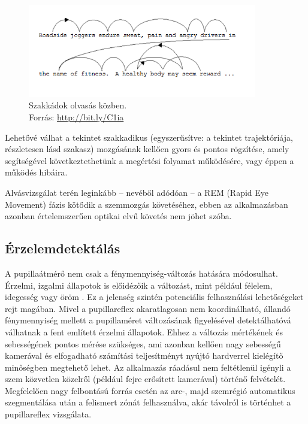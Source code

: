 \begin{figure}[!ht]
\centering
\includegraphics[width=100mm, keepaspectratio]{figures/read_saccade.png}
\caption{Szakkádok olvasás közben.\\Forrás: \url{http://bit.ly/C1ia}}
\label{fig:read_saccade}
\end{figure}

Lehetővé válhat a tekintet szakkadikus (egyszerűsítve: a tekintet trajektóriája, részletesen lásd  szakasz) mozgásának kellően gyors és pontos rögzítése, amely segítségével következtethetünk a megértési folyamat működésére, vagy éppen a működés hibáira. 

\bigskip

Alvásvizsgálat terén leginkább -- nevéből adódóan -- a REM (Rapid Eye Movement) fázis kötődik a szemmozgás követéséhez, ebben az alkalmazásban azonban értelemszerűen optikai elvű követés nem jöhet szóba.

\subsection{Érzelemdetektálás}\label{sect:erzelem}

A pupillaátmérő nem csak a fénymennyiség-változás hatására módosulhat. Érzelmi, izgalmi állapotok is előidézőik a változást, mint például félelem, idegesség vagy öröm \cite{altpszicho}. Ez a jelenség szintén potenciális felhasználási lehetőségeket rejt magában. Mivel a pupillareflex akaratlagosan nem koordinálható, állandó fénymennyiség mellett a pupillaméret változásának figyelésével detektálhatóvá válhatnak a fent említett érzelmi állapotok. Ehhez a változás mértékének és sebességének pontos mérése szükséges, ami azonban kellően nagy sebességű kamerával és elfogadható számítási teljesítményt nyújtó hardverrel kielégítő minőségben megtehető lehet. Az alkalmazás ráadásul nem feltétlenül igényli a szem közvetlen közelről (például fejre erősített kamerával) történő felvételét. Megfelelően nagy felbontású forrás esetén az arc-, majd szemrégió automatikus szegmentálása után a felismert zónát felhasználva, akár távolról is történhet a pupillareflex vizsgálata.

